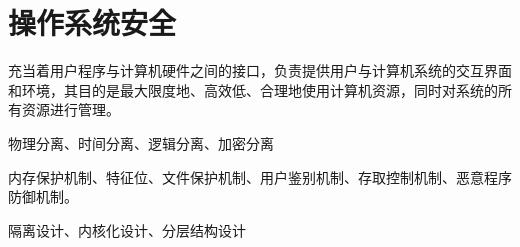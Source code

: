 \chapter{操作系统安全}
充当着用户程序与计算机硬件之间的接口，负责提供用户与计算机系统的交互界面和环境，其目的是最大限度地、高效低、合理地使用计算机资源，同时对系统的所有资源进行管理。

物理分离、时间分离、逻辑分离、加密分离

内存保护机制、特征位、文件保护机制、用户鉴别机制、存取控制机制、恶意程序防御机制。

隔离设计、内核化设计、分层结构设计

